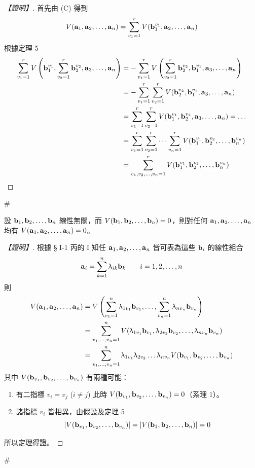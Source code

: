 \begin{proof}[【證明】]
首先由 (C) 得到
\[ V(\boldsymbol{\mathbf{a}}_1, \boldsymbol{\mathbf{a}}_2, \dots, \boldsymbol{\mathbf{a}}_n) = \sum_{v_1=1}^r V(\boldsymbol{\mathbf{b}}_1^{v_1}, \boldsymbol{\mathbf{a}}_2, \dots, \boldsymbol{\mathbf{a}}_n) \]
根據定理 5
\begin{align*}
\sum_{v_1=1}^r V\left(\boldsymbol{\mathbf{b}}_1^{v_1}, \sum_{v_2=1}^r \boldsymbol{\mathbf{b}}_2^{v_2}, \boldsymbol{\mathbf{a}}_3, \dots, \boldsymbol{\mathbf{a}}_n\right) &= - \sum_{v_1=1}^r V\left(\sum_{v_2=1}^r \boldsymbol{\mathbf{b}}_2^{v_2}, \boldsymbol{\mathbf{b}}_1^{v_1}, \boldsymbol{\mathbf{a}}_3, \dots, \boldsymbol{\mathbf{a}}_n\right) \\
&= - \sum_{v_1=1}^r \sum_{v_2=1}^r V(\boldsymbol{\mathbf{b}}_2^{v_2}, \boldsymbol{\mathbf{b}}_1^{v_1}, \boldsymbol{\mathbf{a}}_3, \dots, \boldsymbol{\mathbf{a}}_n) \\
&= \sum_{v_1=1}^r \sum_{v_2=1}^r V(\boldsymbol{\mathbf{b}}_1^{v_1}, \boldsymbol{\mathbf{b}}_2^{v_2}, \boldsymbol{\mathbf{a}}_3, \dots, \boldsymbol{\mathbf{a}}_n) = \dots \\
&= \sum_{v_1=1}^r \sum_{v_2=1}^r \dots \sum_{v_n=1}^r V(\boldsymbol{\mathbf{b}}_1^{v_1}, \boldsymbol{\mathbf{b}}_2^{v_2}, \dots, \boldsymbol{\mathbf{b}}_n^{v_n}) \\
&= \sum_{v_1, v_2, \dots, v_n=1}^r V(\boldsymbol{\mathbf{b}}_1^{v_1}, \boldsymbol{\mathbf{b}}_2^{v_2}, \dots, \boldsymbol{\mathbf{b}}_n^{v_n})
\end{align*}
\end{proof}\hfill$\#$

\begin{theorem}\label{thm:b6-1-8}
設 $\boldsymbol{\mathbf{b}}_1, \boldsymbol{\mathbf{b}}_2, \dots, \boldsymbol{\mathbf{b}}_n$ 線性無關，而 $V(\boldsymbol{\mathbf{b}}_1, \boldsymbol{\mathbf{b}}_2, \dots, \boldsymbol{\mathbf{b}}_n) = 0$，則對任何 $\boldsymbol{\mathbf{a}}_1, \boldsymbol{\mathbf{a}}_2, \dots, \boldsymbol{\mathbf{a}}_n$ 均有 $V(\boldsymbol{\mathbf{a}}_1, \boldsymbol{\mathbf{a}}_2, \dots, \boldsymbol{\mathbf{a}}_n) = 0$。
\end{theorem}

\begin{proof}[【證明】]
根據 § I-1 丙的 I 知任 $\boldsymbol{\mathbf{a}}_1, \boldsymbol{\mathbf{a}}_2, \dots, \boldsymbol{\mathbf{a}}_n$ 皆可表為這些 $\boldsymbol{\mathbf{b}}_i$ 的線性組合
\begin{equation}
\boldsymbol{\mathbf{a}}_i = \sum_{k=1}^n \uplambda_{ik} \boldsymbol{\mathbf{b}}_k \qquad i=1, 2, \dots, n \label{eq:b6-1-4-2}
\end{equation}
則
\begin{align*}
V(\boldsymbol{\mathbf{a}}_1, \boldsymbol{\mathbf{a}}_2, \dots, \boldsymbol{\mathbf{a}}_n) &= V\left(\sum_{v_1=1}^n \uplambda_{1v_1} \boldsymbol{\mathbf{b}}_{v_1}, \dots, \sum_{v_n=1}^n \uplambda_{nv_n} \boldsymbol{\mathbf{b}}_{v_n}\right) \\
&= \sum_{v_1, \dots, v_n=1}^n V(\uplambda_{1v_1} \boldsymbol{\mathbf{b}}_{v_1}, \uplambda_{2v_2} \boldsymbol{\mathbf{b}}_{v_2}, \dots, \uplambda_{nv_n} \boldsymbol{\mathbf{b}}_{v_n}) \\
&= \sum_{v_1, \dots, v_n=1}^n \uplambda_{1v_1} \uplambda_{2v_2} \dots \uplambda_{nv_n} V(\boldsymbol{\mathbf{b}}_{v_1}, \boldsymbol{\mathbf{b}}_{v_2}, \dots, \boldsymbol{\mathbf{b}}_{v_n})
\end{align*}
其中 $V(\boldsymbol{\mathbf{b}}_{v_1}, \boldsymbol{\mathbf{b}}_{v_2}, \dots, \boldsymbol{\mathbf{b}}_{v_n})$ 有兩種可能：
\begin{enumerate}[label=(\roman*), leftmargin=2em]
  \item 有二指標 $v_i = v_j$ ($i \ne j$) 此時 $V(\boldsymbol{\mathbf{b}}_{v_1}, \boldsymbol{\mathbf{b}}_{v_2}, \dots, \boldsymbol{\mathbf{b}}_{v_n}) = 0$（系理 1）。
  \item 諸指標 $v_i$ 皆相異，由假設及定理 5
  \[ |V(\boldsymbol{\mathbf{b}}_{v_1}, \boldsymbol{\mathbf{b}}_{v_2}, \dots, \boldsymbol{\mathbf{b}}_{v_n})| = |V(\boldsymbol{\mathbf{b}}_1, \boldsymbol{\mathbf{b}}_2, \dots, \boldsymbol{\mathbf{b}}_n)| = 0 \]
\end{enumerate}
所以定理得證。\end{proof}\hfill$\#$

